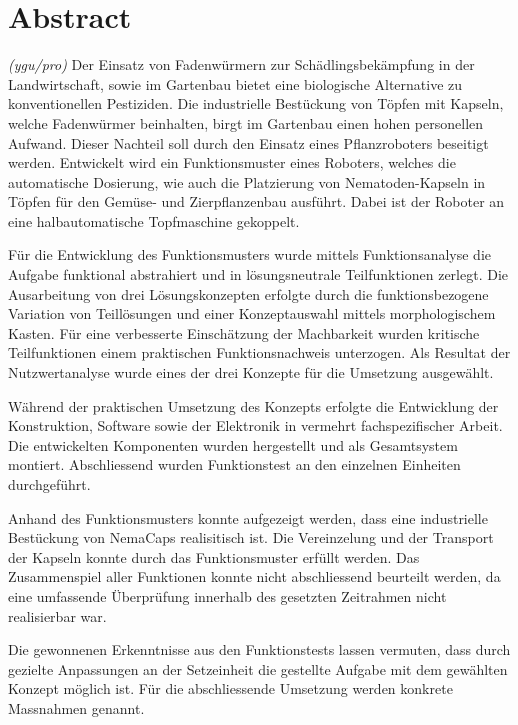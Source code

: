 \newpage
\section{Abstract}
\textit{(ygu/pro)} Der Einsatz von Fadenwürmern zur Schädlingsbekämpfung in der Landwirtschaft, sowie im Gartenbau bietet eine biologische Alternative zu konventionellen Pestiziden. Die industrielle Bestückung von Töpfen mit Kapseln, welche Fadenwürmer beinhalten, birgt im Gartenbau einen hohen personellen Aufwand. Dieser Nachteil soll durch den Einsatz eines Pflanzroboters beseitigt werden. Entwickelt wird ein Funktionsmuster eines Roboters, welches die automatische Dosierung, wie auch die Platzierung von Nematoden-Kapseln in Töpfen für den Gemüse- und Zierpflanzenbau ausführt. Dabei ist der Roboter an eine halbautomatische Topfmaschine gekoppelt.
\newline

Für die Entwicklung des Funktionsmusters wurde mittels Funktionsanalyse die Aufgabe funktional abstrahiert und in lösungsneutrale Teilfunktionen zerlegt. Die Ausarbeitung von drei Lösungskonzepten erfolgte durch die funktionsbezogene Variation von Teillösungen und einer Konzeptauswahl mittels morphologischem Kasten. Für eine verbesserte Einschätzung der Machbarkeit wurden kritische Teilfunktionen einem praktischen Funktionsnachweis unterzogen. Als Resultat der Nutzwertanalyse wurde eines der drei Konzepte für die Umsetzung ausgewählt.
\newline

Während der praktischen Umsetzung des Konzepts erfolgte die Entwicklung der Konstruktion, Software sowie der Elektronik in vermehrt fachspezifischer Arbeit. Die entwickelten Komponenten wurden hergestellt und als Gesamtsystem montiert. Abschliessend wurden Funktionstest an den einzelnen Einheiten durchgeführt.
\newline

Anhand des Funktionsmusters konnte aufgezeigt werden, dass eine industrielle Bestückung von NemaCaps realisitisch ist. Die Vereinzelung und der Transport der Kapseln konnte durch das Funktionsmuster erfüllt werden. Das Zusammenspiel aller Funktionen konnte nicht abschliessend beurteilt werden, da eine umfassende Überprüfung innerhalb des gesetzten Zeitrahmen nicht realisierbar war.
\newline

Die gewonnenen Erkenntnisse aus den Funktionstests lassen vermuten, dass durch gezielte Anpassungen an der Setzeinheit die gestellte Aufgabe mit dem gewählten Konzept möglich ist. Für die abschliessende Umsetzung werden konkrete Massnahmen genannt.

